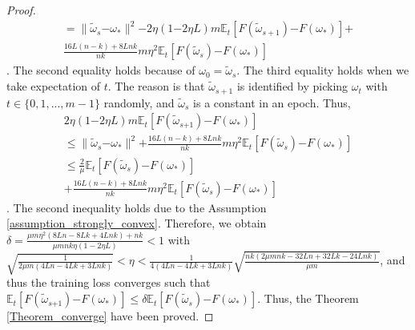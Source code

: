 \documentclass[letterpaper]{article}
\begin{document}
\begin{proof}
\begin{equation}
\begin{array}{ll}
= \parallel  \tilde{\omega}_{s}\mathrm{-}\omega_\ast  \parallel^2  \mathrm{-}2\eta(1\mathrm{-}2\eta L)m \mathbb{E}_t[F(\tilde{\omega}_{s+1}) \mathrm{-} F(\omega_\ast) ] \mathrm{+} \\
\frac{16L(n-k)+8Lnk}{nk} m \eta^2 \mathbb{E}_t [F(\tilde{\omega}_s)\mathrm{-}F(\omega_\ast)]
\end{array} 
\end{equation}. The second equality  holds because of $\omega_0=\tilde{\omega}_s$. The third equality holds when we take expectation of $t$. The reason is that $\tilde{\omega}_{s+1}$  is identified by picking $\omega_t$ with $t\in\{0,1, ..., m-1\}$ randomly, and $\tilde{\omega}_s$ is a constant in an epoch.  Thus, 
\begin{equation}
\begin{array}{ll}
2\eta(1\mathrm{-}2\eta L)m \mathbb{E}_t [F(\tilde{\omega}_{s\mathrm{+}1}) \mathrm{-} F(\omega_\ast) ] \\
\le  \parallel  \tilde{\omega}_{s}\mathrm{-}\omega_\ast  \parallel^2 \mathrm{+} \frac{16L(n-k)+8Lnk}{nk} m \eta^2 \mathbb{E}_t[F(\tilde{\omega}_s)\mathrm{-}F(\omega_\ast)] \\ 
\le \frac{2}{\mu}\mathbb{E}_t[ F(\tilde{\omega}_{s}) \mathrm{-}  F(\omega_\ast)  ]\\
 \mathrm{+} \frac{16L(n-k)+8Lnk}{nk} m \eta^2 \mathbb{E}_t[F(\tilde{\omega}_s)\mathrm{-}F(\omega_\ast)]
\end{array} 
\end{equation}. The second inequality holds due to the Assumption \ref{assumption_strongly_convex}. Therefore, we obtain $\delta=\frac{\mu m \eta^2 (8Ln-8Lk+4Lnk)+nk}{  \mu m nk \eta (1-2\eta L)  } < 1$ with $\sqrt{\frac{1}{2\mu m (4Ln-4Lk+3Lnk)}} < \eta < \frac{1}{4(4Ln-4Lk+3Lnk)}\sqrt{\frac{nk(2\mu mnk - 32Ln+ 32 Lk -24 Lnk)}{\mu m}}$, and thus the training loss converges such that
$\mathbb{E}_t[F(\tilde{\omega}_{s\mathrm{+}1}) \mathrm{-} F(\omega_\ast)]  \le \delta \mathbb{E}_t[F(\tilde{\omega}_s)\mathrm{-}F(\omega_\ast)]$.  Thus, the Theorem \ref{Theorem_converge} have been proved.
\end{proof}
\end{document}
